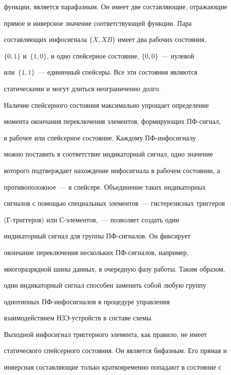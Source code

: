 функции, является парафазным. Он име\-ет две составляющие, отражающие


прямое и инверсное значение соответствующей функции. Пара


составляющих инфосигнала $\{X, XB\}$ имеет два рабочих состояния,


$\{0, 1\}$ и~$\{1, 0\}$, и одно спейсерное состояние, $\{0, 0\}$~--- нулевой


или~$\{1, 1\}$~--- единичный спейсеры. Все эти состояния являются


статическими и могут длиться неограниченно долго.





   Наличие спейсерного состояния максимально упрощает определение


момента окончания переключения элементов, формирующих ПФ-сиг\-нал,


в рабочее или спейсерное состояние. Каждому ПФ-ин\-фо\-сиг\-на\-лу


можно поставить в соответствие индикаторный сигнал, одно значение


которого подтверждает нахождение инфосигнала в рабочем состоянии, а


противоположное~--- в спейсере. Объединение таких индикаторных


сигналов с помощью специальных элементов~--- гистерезисных триггеров


(Г-триг\-ге\-ров) или С-эле\-мен\-тов,~--- позволяет создать один


индикаторный сигнал для группы ПФ-сиг\-на\-лов. Он фиксирует


окончание переключения нескольких ПФ-сиг\-на\-лов, например,


многоразрядной шины данных, в очередную фазу работы. Таким образом,


один индикаторный сигнал способен заменить собой любую группу


однотипных ПФ-ин\-фо\-сиг\-на\-лов в процедуре управ\-ле\-ния


взаимодействием НЗЭ-устройств в составе схемы.





   Выходной инфосигнал триггерного элемента, как правило, не имеет


статического спейсерного состояния. Он является бифазным. Его прямая и


инверсная составляющие только кратковременно попадают в состояние с


